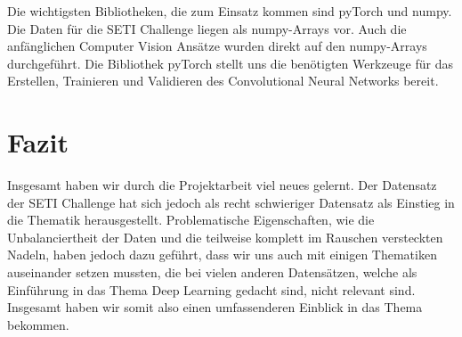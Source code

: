 \documentclass[12pt, a4paper]{article}
\begin{document}
Die wichtigsten Bibliotheken, die zum Einsatz kommen sind pyTorch und numpy. Die Daten für die SETI Challenge liegen als numpy-Arrays vor. Auch die anfänglichen Computer Vision Ansätze wurden direkt auf den numpy-Arrays durchgeführt. Die Bibliothek pyTorch stellt uns die benötigten Werkzeuge für das Erstellen, Trainieren und Validieren des Convolutional Neural Networks bereit.

\section{Fazit}
Insgesamt haben wir durch die Projektarbeit viel neues gelernt. Der Datensatz der SETI Challenge hat sich jedoch als recht schwieriger Datensatz als Einstieg in die Thematik herausgestellt. Problematische Eigenschaften, wie die Unbalanciertheit der Daten und die teilweise komplett im Rauschen versteckten Nadeln, haben jedoch dazu geführt, dass wir uns auch mit einigen Thematiken auseinander setzen mussten, die bei vielen anderen Datensätzen, welche als Einführung in das Thema Deep Learning gedacht sind, nicht relevant sind. Insgesamt haben wir somit also einen umfassenderen Einblick in das Thema bekommen.



\end{document}
